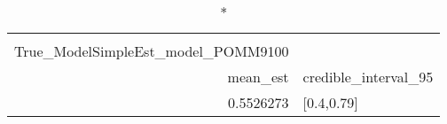 \begin{longtable}{rl}
\caption*{
{\large Ssummarytable} \\ 
{\small True\_ModelSimpleEst\_model\_POMM9100}
} \\ 
\toprule
mean\_est & credible\_interval\_95 \\ 
\midrule
0.5526273 & [0.4,0.79] \\ 
\bottomrule
\end{longtable}

